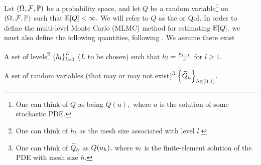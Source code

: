 
Let $\OFP$ be a probability space, and let $Q$ be a random variable\footnote{One can think of $Q$ as being $Q(u),$ where $u$ is the solution of some stochastic PDE.} on $\OFP$ such that $\EXP{Q} < \infty.$ We will refer to $Q$ as the  or QoI. In order to define the multi-level Monte Carlo (MLMC) method for estimating $\EXP{Q},$ we must also define the following quantities, following  \cite[Theorem 1]{ClGiScTe:11}. We assume there exist
\bit
\item A set of levels\footnote{One can think of $h_{l}$ as the mesh size associated with level $l$.} $\set{\hl}_{l=0}^L$ ($L$ to be chosen) such that $h_{l} =\frac{h_{l-1}}s$ for $l \geq 1.$
\item A set of random variables (that may or may not exist)\footnote{One can think of $\widetilde{Q}_{h}$ as $Q(u_{h}),$ where $u_{l}$ is the finite-element solution of the PDE with mesh size $h  $.} $\set{\Qhtilde}_{h \in (0,1)}.$
  \eit

